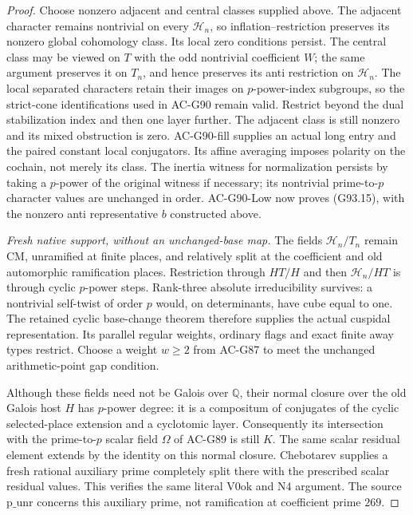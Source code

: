 \begin{proof}
Choose nonzero adjacent and central classes supplied above.
The adjacent character remains nontrivial on every
\(\mathcal H_n\), so inflation--restriction preserves its
nonzero global cohomology class.  Its local zero conditions
persist.  The central class may be viewed on \(T\) with
the odd nontrivial coefficient \(W\); the same argument
preserves it on \(T_n\), and hence preserves its anti
restriction on \(\mathcal H_n\).
The local separated characters retain their images on
\(p\)-power-index subgroups, so the strict-cone identifications
used in AC-G90 remain valid.  Restrict beyond the dual
stabilization index and then one layer further.
The adjacent class is still nonzero and its mixed obstruction
is zero.  AC-G90-fill supplies an actual long entry and
the paired constant local conjugators.  Its affine averaging
imposes polarity on the cochain, not merely its class.
The inertia witness for normalization persists by taking
a \(p\)-power of the original witness if necessary;
its nontrivial prime-to-\(p\) character values are unchanged
in order.  AC-G90-Low now proves (G93.15), with the nonzero
anti representative \(b\) constructed above.

\emph{Fresh native support, without an unchanged-base map.}
The fields \(\mathcal H_n/T_n\) remain CM, unramified at
finite places, and relatively split at the coefficient and
old automorphic ramification places.  Restriction through
\(HT/H\) and then \(\mathcal H_n/HT\) is through cyclic
\(p\)-power steps.  Rank-three absolute irreducibility survives:
a nontrivial self-twist of order \(p\) would, on determinants,
have cube equal to one.  The retained cyclic base-change
theorem therefore supplies the actual cuspidal representation.
Its parallel regular weights, ordinary flags and exact finite
away types restrict.  Choose a weight \(w\geq2\) from AC-G87
to meet the unchanged arithmetic-point gap condition.

Although these fields need not be Galois over \(\mathbb Q\),
their normal closure over the old Galois host \(H\) has
\(p\)-power degree: it is a compositum of conjugates of
the cyclic selected-place extension and a cyclotomic layer.
Consequently its intersection with the prime-to-\(p\) scalar
field \(\Omega\) of AC-G89 is still \(K\).
The same scalar residual element extends by the identity
on this normal closure.  Chebotarev supplies a fresh rational
auxiliary prime completely split there with the prescribed
scalar residual values.  This verifies the same literal
\(\mathrm{V0ok}\) and \(\mathrm{N4}\) argument.
The source \(\mathrm{p\_unr}\) concerns this auxiliary prime,
not ramification at coefficient prime \(269\).


\end{proof}
